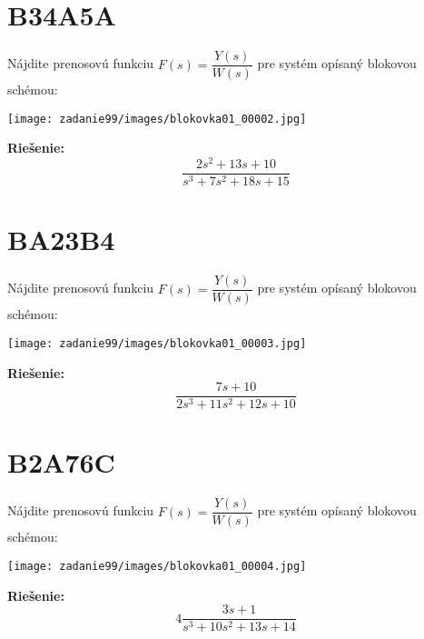 \documentclass[a4paper, 12pt]{article}
\newenvironment{task}{}{}
\newenvironment{solution}{\noindent\textbf{Riešenie:}}{}
\begin{document}
\section*{B34A5A}
\begin{task}
    Nájdite prenosovú funkciu $F(s)=\dfrac{Y(s)}{W(s)}$ pre systém opísaný blokovou schémou: 

    \texttt{[image: zadanie99/images/blokovka01\_00002.jpg]} 
\end{task} 

\begin{solution}
    \begin{equation*}
        \dfrac{2s^2+13s+10}{s^3+7s^2+18s+15}
    \end{equation*}
\end{solution}

\section*{BA23B4}
\begin{task}
    Nájdite prenosovú funkciu $F(s)=\dfrac{Y(s)}{W(s)}$ pre systém opísaný blokovou schémou: 

    \texttt{[image: zadanie99/images/blokovka01\_00003.jpg]} 
\end{task} 

\begin{solution}
    \begin{equation*}
        \dfrac{7s+10}{2s^3+11s^2+12s+10}
    \end{equation*}
\end{solution}

\section*{B2A76C}
\begin{task}
    Nájdite prenosovú funkciu $F(s)=\dfrac{Y(s)}{W(s)}$ pre systém opísaný blokovou schémou: 

    \texttt{[image: zadanie99/images/blokovka01\_00004.jpg]} 
\end{task} 

\begin{solution}
    \begin{equation*}
        4\dfrac{3s+1}{s^3+10s^2+13s+14}
    \end{equation*}
\end{solution}
\end{document}
